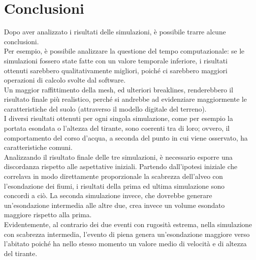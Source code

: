 \section{Conclusioni}
Dopo aver analizzato i risultati delle simulazioni, è possibile trarre alcune conclusioni.\\
Per esempio, è possibile analizzare la questione del tempo computazionale: se le simulazioni fossero state fatte con un valore temporale inferiore, i risultati ottenuti sarebbero qualitativamente migliori, poiché ci sarebbero maggiori operazioni di calcolo svolte dal software.\\
Un maggior raffittimento della mesh, ed ulteriori breaklines, renderebbero il risultato finale più realistico, perché si andrebbe ad evidenziare maggiormente le caratteristiche del suolo (attraverso il modello digitale del terreno).\\
I diversi risultati ottenuti per ogni singola simulazione, come per esempio la portata esondata o l'altezza del tirante, sono coerenti tra di loro; ovvero, il comportamento del corso d'acqua, a seconda del punto in cui viene osservato, ha caratteristiche comuni.\\
Analizzando il risultato finale delle tre simulazioni, è necessario esporre una discordanza rispetto alle aspettative iniziali. Partendo dall'ipotesi iniziale che correlava in modo direttamente proporzionale la scabrezza dell'alveo con l'esondazione dei fiumi, i risultati della prima ed ultima simulazione sono concordi a ciò. La seconda simulazione invece, che dovrebbe generare un'esondazione intermedia alle altre due, crea invece un volume esondato maggiore rispetto alla prima.\\
Evidentemente, al contrario dei due eventi con rugosità estrema, nella simulazione con scabrezza intermedia, l'evento di piena genera un'esondazione maggiore verso l'abitato poiché ha nello stesso momento un valore medio di velocità e di altezza del tirante.

